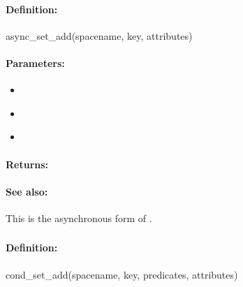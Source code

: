 \paragraph{Definition:}
\begin{rubycode}
async_set_add(spacename, key, attributes)
\end{rubycode}

\paragraph{Parameters:}
\begin{itemize}[noitemsep]
\item {}\\

\item {}\\

\item {}\\

\end{itemize}

\paragraph{Returns:}


\paragraph{See also:}  This is the asynchronous form of .

\pagebreak
\subsubsection{}
\label{api:ruby:cond_set_add}


\paragraph{Definition:}
\begin{rubycode}
cond_set_add(spacename, key, predicates, attributes)
\end{rubycode}

